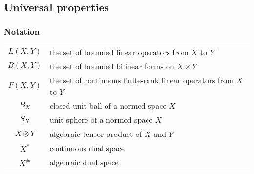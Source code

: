 \documentclass{../../large}
\begin{document}
\chapter{}
\section{Universal properties}
\subsection*{Notation}
\begin{tabular}{cl}
$L(X,Y)$ & the set of bounded linear operators from $X$ to $Y$\\
$B(X,Y)$ & the set of bounded bilinear forms on $X\times Y$\\
$F(X,Y)$ & the set of continuous finite-rank linear operators from $X$ to $Y$\\
$B_X$ & closed unit ball of a normed space $X$\\
$S_X$ & unit sphere of a normed space $X$\\
$X\otimes Y$ & algebraic tensor product of $X$ and $Y$\\
$X^*$ & continuous dual space\\
$X^\#$ & algebraic dual space
\end{tabular}
\end{document}
